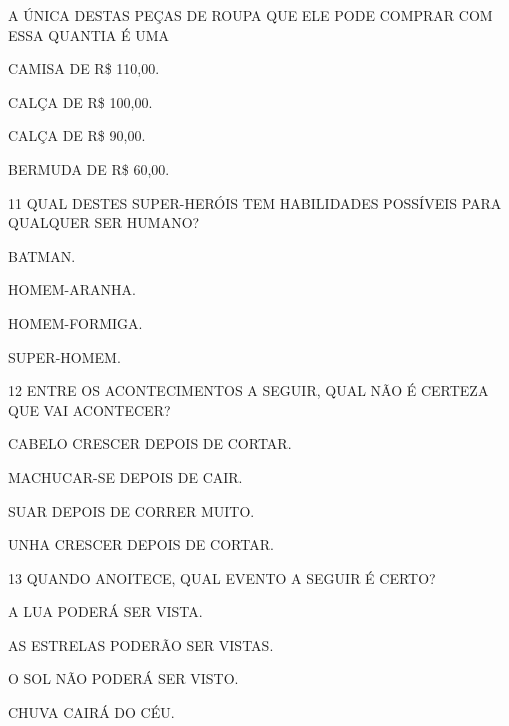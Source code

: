 A ÚNICA DESTAS PEÇAS DE ROUPA QUE ELE PODE COMPRAR COM ESSA QUANTIA É UMA

\begin{escolha}
\item CAMISA DE R\$ 110,00.

\item CALÇA DE R\$ 100,00.

\item CALÇA DE R\$ 90,00.

\item BERMUDA DE R\$ 60,00.
\end{escolha}

\num{11} QUAL DESTES SUPER-HERÓIS TEM HABILIDADES POSSÍVEIS PARA QUALQUER SER HUMANO?

\begin{escolha}
\item BATMAN.

\item HOMEM-ARANHA.

\item HOMEM-FORMIGA.

\item SUPER-HOMEM.
\end{escolha}

\pagebreak
\num{12} ENTRE OS ACONTECIMENTOS A SEGUIR, QUAL NÃO É CERTEZA QUE VAI
ACONTECER?

\begin{escolha}[itemsep=0pt]
\item CABELO CRESCER DEPOIS DE CORTAR.

\item MACHUCAR-SE DEPOIS DE CAIR.

\item SUAR DEPOIS DE CORRER MUITO.

\item UNHA CRESCER DEPOIS DE CORTAR.
\end{escolha}

\num{13} QUANDO ANOITECE, QUAL EVENTO A SEGUIR É CERTO?

\begin{escolha}[itemsep=0pt]
\item A LUA PODERÁ SER VISTA.

\item AS ESTRELAS PODERÃO SER VISTAS.

\item O SOL NÃO PODERÁ SER VISTO.

\item CHUVA CAIRÁ DO CÉU.
\end{escolha}

